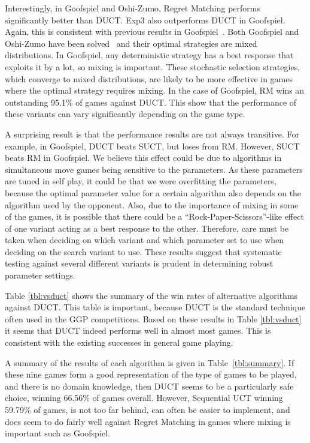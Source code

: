\documentclass[conference]{IEEEtran}
\begin{document}
Interestingly, in Goofspiel and Oshi-Zumo, Regret Matching performs significantly better than DUCT. Exp3 also outperforms DUCT in Goofspiel. 
Again, this is consistent with previous results in Goofspiel~\cite{Lanctot13Goofspiel}. Both Goofspiel and Oshi-Zumo have been 
solved~\cite{Buro03OshiZumo,Rhoads12Computer} and their optimal strategies are mixed distributions. In Goofspiel, any deterministic strategy 
has a best response that exploits it by a lot, so mixing is important. These stochastic selection strategies, 
which converge to mixed distributions, are likely to be more effective in games where the optimal strategy requires mixing. 
In the case of Goofspiel, RM wins an outstanding 95.1\% of games against DUCT. This show that the performance of these variants can vary 
significantly depending on the game type. 

A surprising result is that the performance results are not always transitive. For example, in Goofspiel, DUCT beats SUCT, but loses from RM. 
However, SUCT beats RM in Goofspiel. We believe this effect could be due to algorithms in simultaneous move games being
sensitive to the parameters. As these parameters are tuned in self play, it could be that we were overfitting the parameters, because 
the optimal parameter value for a certain algorithm also depends on the algorithm used by the opponent. Also, due to the importance of mixing 
in some of the games, it is possible that there could be a ``Rock-Paper-Scissors''-like effect of one variant acting as a best response to 
the other. Therefore, care must be taken when deciding on which variant and which parameter set to use when deciding on the search variant to 
use. These results suggest that systematic testing against several different variants is prudent in determining robust parameter settings. 

Table \ref{tbl:vsduct} shows the summary of the win rates of alternative algorithms against DUCT. This table is important, because DUCT is the 
standard technique often used in the GGP competitions. Based on these results in Table \ref{tbl:vsduct} it seems that DUCT indeed performs 
well in almost most games. This is consistent with the existing successes in general game playing. 

A summary of the results of each algorithm is given in Table~\ref{tbl:summary}. If these nine games form a good representation of the type 
of games to be played, and there is no domain knowledge, then DUCT seems to be a particularly safe choice, winning 66.56\% of games overall. 
However, Sequential UCT winning 59.79\% of games, is not too far behind, can often be easier to implement, and does seem to do fairly well
against Regret Matching in games where mixing is important such as Goofspiel.  
\end{document}
